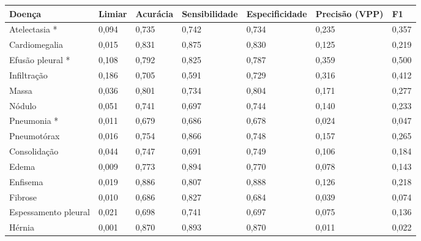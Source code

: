 \begin{tabular}{lllllll}
\toprule
Doença & Limiar & Acurácia & Sensibilidade & Especificidade & Precisão (VPP) & F1 \\
\midrule
Atelectasia * & 0,094 & 0,735 & 0,742 & 0,734 & 0,235 & 0,357 \\
Cardiomegalia & 0,015 & 0,831 & 0,875 & 0,830 & 0,125 & 0,219 \\
Efusão pleural * & 0,108 & 0,792 & 0,825 & 0,787 & 0,359 & 0,500 \\
Infiltração & 0,186 & 0,705 & 0,591 & 0,729 & 0,316 & 0,412 \\
Massa & 0,036 & 0,801 & 0,734 & 0,804 & 0,171 & 0,277 \\
Nódulo & 0,051 & 0,741 & 0,697 & 0,744 & 0,140 & 0,233 \\
Pneumonia * & 0,011 & 0,679 & 0,686 & 0,678 & 0,024 & 0,047 \\
Pneumotórax & 0,016 & 0,754 & 0,866 & 0,748 & 0,157 & 0,265 \\
Consolidação & 0,044 & 0,747 & 0,691 & 0,749 & 0,106 & 0,184 \\
Edema & 0,009 & 0,773 & 0,894 & 0,770 & 0,078 & 0,143 \\
Enfisema & 0,019 & 0,886 & 0,807 & 0,888 & 0,126 & 0,218 \\
Fibrose & 0,010 & 0,686 & 0,827 & 0,684 & 0,039 & 0,074 \\
Espessamento pleural & 0,021 & 0,698 & 0,741 & 0,697 & 0,075 & 0,136 \\
Hérnia & 0,001 & 0,870 & 0,893 & 0,870 & 0,011 & 0,022 \\
\bottomrule
\end{tabular}
